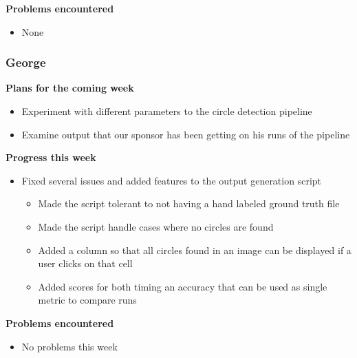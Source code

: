 \documentclass[10pt, onecolumn, draftclsnofoot, letterpaper, compsoc]{IEEEtran}
\begin{document}
    \noindent \textbf{Problems encountered}

    \begin{itemize}

    \item None

    \end{itemize}

    \subsubsection{George}

    \noindent \textbf{Plans for the coming week}

    \begin{itemize}

    \item Experiment with different parameters to the circle detection pipeline
    \item Examine output that our sponsor has been getting on his runs of the pipeline

    \end{itemize}

    \noindent \textbf{Progress this week}

    \begin{itemize}

    \item Fixed several issues and added features to the output generation script
    \begin{itemize}
      \item Made the script tolerant to not having a hand labeled ground truth file
      \item Made the script handle cases where no circles are found
      \item Added a column so that all circles found in an image can be displayed if a user clicks on that cell
      \item Added scores for both timing an accuracy that can be used as single metric to compare runs
    \end{itemize}

    \end{itemize}

    \noindent \textbf{Problems encountered}

    \begin{itemize}

    \item No problems this week

    \end{itemize}
\end{document}
